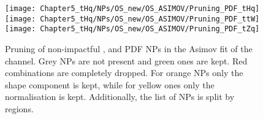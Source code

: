\begin{figure}[h]
  \centering
  \texttt{[image: Chapter5\_tHq/NPs/OS\_new/OS\_ASIMOV/Pruning\_PDF\_tHq]}
  \texttt{[image: Chapter5\_tHq/NPs/OS\_new/OS\_ASIMOV/Pruning\_PDF\_ttW]}
  \texttt{[image: Chapter5\_tHq/NPs/OS\_new/OS\_ASIMOV/Pruning\_PDF\_tZq]}
   \caption{Pruning of non-impactful \tHq, \ttW and \tZq PDF NPs in the Asimov fit of the \dilepOStau channel. Grey NPs are 
   not present and green ones are kept. Red combinations are completely dropped. For orange NPs only the shape 
   component is kept, while for yellow ones only the normalisation is kept. Additionally, the list of NPs is split by regions.}
  \label{fig:Appendix:AdditionalResults:OS:Asimov:Pruning:tHqPDF}
\end{figure}



